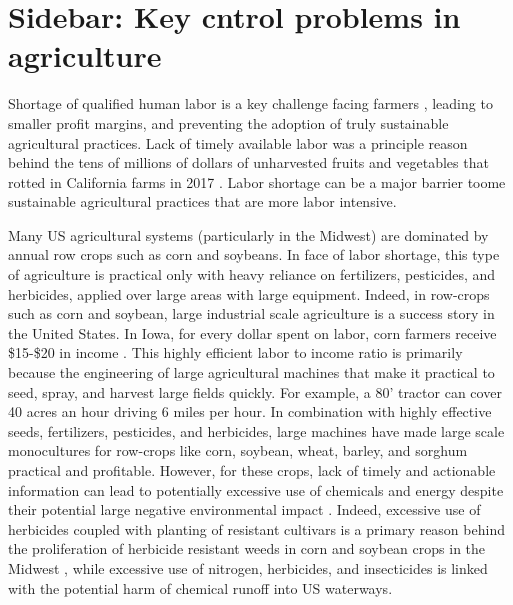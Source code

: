 \section[How can control engineers help agriculture]{Sidebar: Key cntrol problems in agriculture}\label{sb:ag}


Shortage of qualified human labor is a key challenge facing farmers \cite{richards2018immigration,hertz2013there}, leading to smaller profit margins, and preventing the adoption of truly sustainable agricultural practices. Lack of timely available labor was a principle reason behind the tens of millions of dollars of unharvested fruits and vegetables that rotted in California farms in 2017 \cite{guthman2017paradoxes,RN4026}.  Labor shortage can be a major barrier toome sustainable agricultural practices that are more labor intensive.

Many US agricultural systems (particularly in the Midwest) are dominated by annual row crops such as corn and soybeans. In face of labor shortage, this type of agriculture is practical only with heavy reliance on fertilizers, pesticides, and herbicides, applied over large areas with large equipment. Indeed, in row-crops such as corn and soybean, large industrial scale agriculture is a success story in the United States. In Iowa, for every dollar spent on labor, corn farmers receive \$15-\$20 in income \cite{plastina2018estimated}.  This highly efficient labor to income ratio is primarily because the engineering of large agricultural machines that make it practical to seed, spray, and harvest large fields quickly. For example, a 80' tractor can cover 40 acres an hour driving 6 miles per hour. In combination with highly effective seeds, fertilizers, pesticides, and herbicides, large machines have made large scale monocultures for row-crops like corn, soybean, wheat, barley, and sorghum practical and profitable. However, for these crops, lack of timely and actionable information can lead to potentially excessive use of chemicals and energy despite their potential large negative environmental impact \cite{capellesso2016economic,foley2011solutions,Godfray2010Food}. Indeed, excessive use of herbicides coupled with planting of resistant cultivars is a primary reason behind the proliferation of herbicide resistant weeds in corn and soybean crops in the Midwest \cite{heap2016web,livingston2016economic,gianessi2007value} , while excessive use of nitrogen, herbicides, and insecticides is linked with the potential harm of chemical runoff into US waterways.

